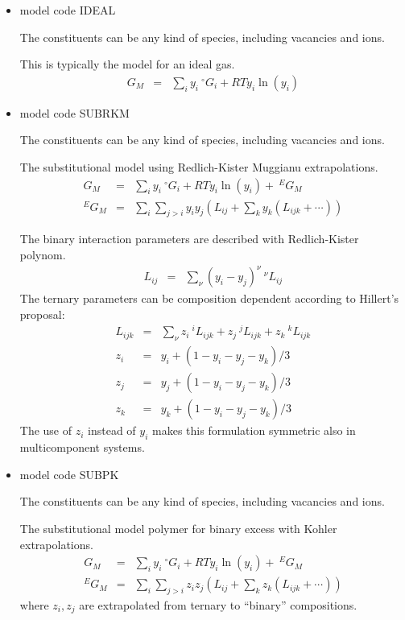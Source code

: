 \documentclass[12pt]{article}
\begin{document}
\begin{itemize}
\item model code IDEAL

  The constituents can be any kind of species, including vacancies and
  ions.

  This is typically the model for an ideal gas.
  \begin{eqnarray}
    G_M &=& \sum_i y_i~^{\circ}G_i + RT y_i\ln(y_i)\label{eq:ideal}
  \end{eqnarray}

\item model code SUBRKM

  The constituents can be any kind of species, including vacancies and
  ions.

  The substitutional model using Redlich-Kister Muggianu extrapolations.
  \begin{eqnarray}
    G_M &=& \sum_i y_i~^{\circ}G_i + RT y_i\ln(y_i) + ~^EG_M\\
    ^EG_M &=& \sum_i \sum_{j>i} y_i y_j (L_{ij} + \sum_k y_k (L_{ijk} + \cdots))
  \end{eqnarray}

  The binary interaction parameters are described with Redlich-Kister polynom.
  \begin{eqnarray}
    L_{ij} &=& \sum_{\nu} (y_i-y_j)^{\nu} ~^{\nu}L_{ij}\label{eq:rk2}
  \end{eqnarray}
  The ternary parameters can be composition dependent according to Hillert's
  proposal\cite{80Hil}:
  \begin{eqnarray}
    L_{ijk}&=&\sum_{\nu}z_i ~^iL_{ijk}+z_j ~^jL_{ijk}+z_k ~^kL_{ijk}\label{eq:tern}\\
    z_i &=& y_i +(1-y_i-y_j-y_k)/3\nonumber\\
    z_j &=& y_j +(1-y_i-y_j-y_k)/3\nonumber\\
    z_k &=& y_k +(1-y_i-y_j-y_k)/3\nonumber
  \end{eqnarray}
  The use of $z_i$ instead of $y_i$ makes this formulation symmetric
  also in multicomponent systems.

\item model code SUBPK

  The constituents can be any kind of species, including vacancies and
  ions.

  The substitutional model polymer for binary excess with Kohler
  extrapolations.
  \begin{eqnarray}
    G_M &=& \sum_i y_i~^{\circ}G_i + RT y_i\ln(y_i) + ~^EG_M\\
    ^EG_M &=& \sum_i \sum_{j>i} z_i z_j (L_{ij} + \sum_k z_k (L_{ijk} + \cdots))
  \end{eqnarray}
  where $z_i, z_j$ are extrapolated from ternary to ``binary''
  compositions.  


\end{itemize}
\end{document}
